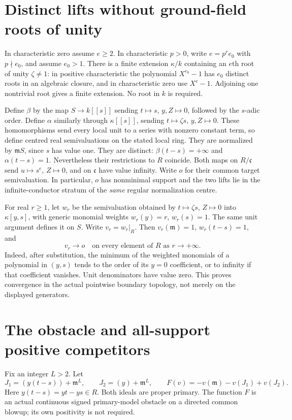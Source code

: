 \documentclass[11pt]{article}
\newcommand{\m}{\mathfrak m}
\begin{document}
\section{Distinct lifts without ground-field roots of unity}
In characteristic zero assume $e\ge2$. In characteristic $p>0$,
write $e=p^r e_0$ with $p\nmid e_0$, and assume $e_0>1$.
There is a finite extension $\kappa/k$ containing an $e$th root
of unity $\zeta\ne1$: in positive characteristic the polynomial
$X^{e_0}-1$ has $e_0$ distinct roots in an algebraic closure,
and in characteristic zero use $X^e-1$. Adjoining one nontrivial
root gives a finite extension. No root in $k$ is required.

Define $\beta$ by the map $S\to k[[s]]$ sending
$t\mapsto s$, $y,Z\mapsto0$, followed by the $s$-adic order.
Define $\alpha$ similarly through $\kappa[[s]]$, sending
$t\mapsto\zeta s$, $y,Z\mapsto0$. These homomorphisms send
every local unit to a series with nonzero constant term, so define
centred real semivaluations on the stated local ring.
They are normalized by $\m S$, since $s$ has value one.
They are distinct: $\beta(t-s)=+\infty$ and $\alpha(t-s)=1$.
Nevertheless their restrictions to $R$ coincide. Both maps on
$R/\mathfrak c$ send $u\mapsto s^e$, $Z\mapsto0$, and on
$\mathfrak c$ have value infinity. Write $o$ for their common
target semivaluation. In particular, $o$ has nonminimal support
and the two lifts lie in the infinite-conductor stratum of the
\emph{same} regular normalization centre.

For real $r\ge1$, let $w_r$ be the semivaluation obtained by
$t\mapsto\zeta s$, $Z\mapsto0$ into $\kappa[y,s]$, with generic
monomial weights $w_r(y)=r$, $w_r(s)=1$. The same unit argument
defines it on $S$. Write $v_r=w_r|_R$.
Then $v_r(\m)=1$, $w_r(t-s)=1$, and
\begin{equation}\label{eq:convergence}
 v_r\longrightarrow o
 \quad\text{on every element of }R\text{ as }r\longrightarrow+\infty.
\end{equation}
Indeed, after substitution, the minimum of the weighted monomials of
a polynomial in $(y,s)$ tends to the order of its $y=0$ coefficient,
or to infinity if that coefficient vanishes. Unit denominators
have value zero. This proves convergence in the actual pointwise
boundary topology, not merely on the displayed generators.

\section{The obstacle and all-support positive competitors}
Fix an integer $L>2$. Let
\[
 J_1=(y(t-s))+\m^L,\qquad J_2=(y)+\m^L,
 \qquad F(v)=-v(\m)-v(J_1)+v(J_2).
\]
Here $y(t-s)=yt-ys\in R$. Both ideals are proper primary.
The function $F$ is an actual continuous signed primary-model
obstacle on a directed common blowup; its own positivity is not required.
\end{document}
